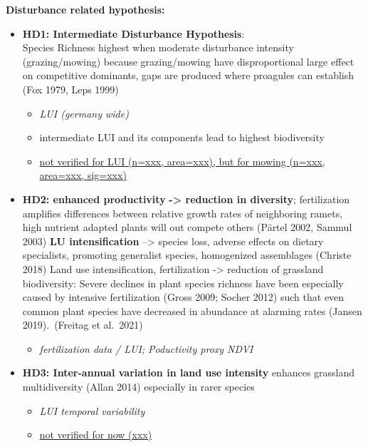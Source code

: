 \documentclass[
  letterpaper,
  DIV=11,
  numbers=noendperiod]{scrartcl}
\providecommand{\tightlist}{%
  \setlength{\itemsep}{0pt}\setlength{\parskip}{0pt}}\usepackage{longtable,booktabs,array}
\begin{document}
\textbf{Disturbance related hypothesis:}

\begin{itemize}
\item
  \textbf{HD1: Intermediate Disturbance Hypothesis}:\\
  Species Richness highest when moderate disturbance intensity
  (grazing/mowing) because grazing/mowing have disproportional large
  effect on competitive dominants, gaps are produced where proagules can
  establish (Fox 1979, Leps 1999)

  \begin{itemize}
  \item
    \emph{LUI (germany wide)}
  \item
    intermediate LUI and its components lead to highest biodiversity
  \item
    \uline{not verified for LUI (n=xxx, area=xxx), but for mowing
    (n=xxx, area=xxx, sig=xxx)}
  \end{itemize}
\item
  \textbf{HD2: enhanced productivity} \textbf{-\textgreater{} reduction
  in diversity}; fertilization amplifies differences between relative
  growth rates of neighboring ramets, high nutrient adapted plants will
  out compete others (Pärtel 2002, Sammul 2003) \textbf{LU
  intensification} --\textgreater{} species loss, adverse effects on
  dietary specialists, promoting generalist species, homogenized
  assemblages (Christe 2018) Land use intensification, fertilization
  -\textgreater{} reduction of grassland biodiversity: Severe declines
  in plant species richness have been especially caused by intensive
  fertilization (Gross 2009; Socher 2012) such that even common plant
  species have decreased in abundance at alarming rates (Jansen
  2019).~(Freitag et al.~2021)

  \begin{itemize}
  \tightlist
  \item
    \emph{fertilization data / LUI; Poductivity proxy NDVI}
  \end{itemize}
\item
  \textbf{HD3: Inter-annual variation in land use intensity} enhances
  grassland multidiversity (Allan 2014) especially in rarer species

  \begin{itemize}
  \item
    \emph{LUI temporal variability}
  \item
    \uline{not verified for now (xxx)}
  \end{itemize}
\end{itemize}
\end{document}
